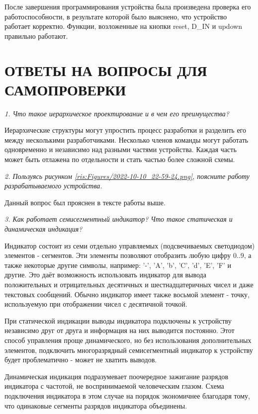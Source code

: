 \begin{sloppypar}
После завершения программирования устройства была произведена проверка его работоспособности, в результате которой было выяснено, что устройство работает корректно. Функции, возложенные на кнопки reset, D\_IN и updown правильно работают.
\section{ОТВЕТЫ НА ВОПРОСЫ ДЛЯ САМОПРОВЕРКИ} %


\textit {1. Что такое иерархическое проектирование и в чем его преимущества?}

Иерархические структуры могут упростить процесс разработки и разделить его между несколькими разработчиками. Несколько членов команды
могут работать одновременно и независимо над разными частями устройства. Каждая часть может быть отлажена по отдельности и стать частью более сложной схемы.

\textit {2. Пользуясь рисунком \ref{ris:Figures/2022-10-10_22-59-24.png}, поясните работу разрабатываемого устройства.}


Данный вопрос был прояснен в тексте работы выше.

\textit {3. Как работает семисегментный индикатор? Что такое статическая и
динамическая индикация?}



Индикатор состоит из семи отдельно управляемых (подсвечиваемых светодиодом) элементов - сегментов. Эти элементы позволяют отобразить любую цифру 0..9, а также некоторые другие символы, например: '-', 'A', 'b', 'C', 'd', 'E', 'F' и другие. Это даёт возможность использовать индикатор для вывода положительных и отрицательных десятичных и шестнадцатеричных чисел и даже текстовых сообщений. Обычно индикатор имеет также восьмой элемент - точку, используемую при отображении чисел с десятичной точкой. 

При статической индикации выводы индикатора подключены к устройству независимо друг от друга и информация на них выводится постоянно. Этот способ управления проще динамического, но без использования дополнительных элементов, подключить многоразрядный семисегментный индикатор к устройству будет проблематично - может не хватить выводов.

Динамическая индикация подразумевает поочередное зажигание разрядов индикатора с частотой, не воспринимаемой человеческим глазом. Схема подключения индикатора в этом случае на порядок экономичнее благодаря тому, что одинаковые сегменты разрядов индикатора объединены.


\end{sloppypar}

